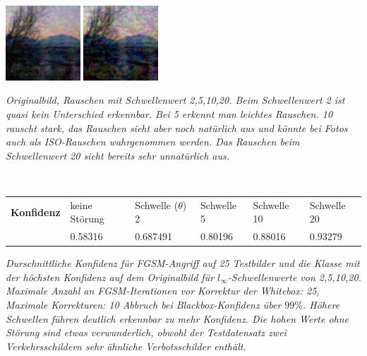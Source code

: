 \documentclass[11pt]{article} %
\begin{document}
\begin{threeparttable}
\includegraphics[height=2.8cm]{IMG_0265_10}
\includegraphics[height=2.8cm]{IMG_0265_20}
\begin{tablenotes}
\footnotesize 
\item\textit{Originalbild, Rauschen mit Schwellenwert 2,5,10,20. Beim Schwellenwert 2 ist quasi kein Unterschied erkennbar. Bei 5 erkennt man leichtes Rauschen. 10 rauscht stark, das Rauschen sieht aber noch natürlich aus und könnte bei Fotos auch als ISO-Rauschen wahrgenommen werden. Das Rauschen beim Schwellenwert 20 sieht bereits sehr unnatürlich aus.}
\end{tablenotes}
\end{threeparttable}
\\  

 \begin{threeparttable}
\begin{small}
\begin{tabular}{llllll}

\textbf{Konfidenz} & keine Störung & Schwelle ($\theta$) 2& Schwelle 5 & Schwelle 10 & Schwelle 20  \\
 &     0.58316         & 0.687491    &          0.80196                     &      0.88016                       &  0.93279  \\

\end{tabular}
\end{small}
 \begin{tablenotes}
      \footnotesize
      \item\textit{Durschnittliche Konfidenz für FGSM-Angriff auf 25 Testbilder und die Klasse mit der höchsten Konfidenz auf dem Originalbild für $l_{\infty}$-Schwellenwerte von 2,5,10,20. Maximale Anzahl an FGSM-Iterationen vor Korrektur der Whitebox: 25, Maximale Korrekturen: 10 Abbruch bei Blackbox-Konfidenz über $99\%$. Höhere Schwellen führen deutlich erkennbar zu mehr Konfidenz. Die hohen Werte ohne Störung sind etwas verwunderlich, obwohl der Testdatensatz zwei Verkehrsschildern sehr ähnliche Verbotsschilder enthält. }
    \end{tablenotes}
  \end{threeparttable}
  
\end{document}
